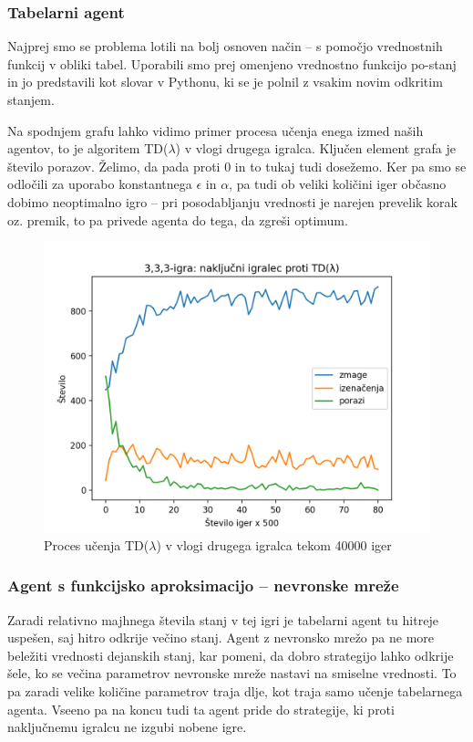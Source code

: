 \documentclass[12pt,a4paper]{amsart}
\theoremstyle{definition} %
\theoremstyle{plain} %
\begin{document}
\subsubsection{Tabelarni agent}
Najprej smo se problema lotili na bolj osnoven način -- s pomočjo vrednostnih funkcij v obliki tabel. 
Uporabili smo prej omenjeno vrednostno funkcijo po-stanj in jo predstavili kot slovar v Pythonu, ki 
se je polnil z vsakim novim odkritim stanjem.

Na spodnjem grafu lahko vidimo primer procesa učenja enega izmed naših agentov, to je algoritem 
TD($\lambda$) v vlogi drugega igralca. Ključen element grafa je število porazov. Želimo, da pada 
proti $0$ in to tukaj tudi dosežemo. Ker pa smo se odločili za uporabo konstantnega $\epsilon$ in 
$\alpha$, pa tudi ob veliki količini iger občasno dobimo neoptimalno igro -- pri posodabljanju 
vrednosti je narejen prevelik korak oz. premik, to pa privede agenta do tega, da zgreši optimum.

\begin{figure}[H]
    \includegraphics[scale=0.725]{../rezultati/tdl-333-40000-2.png}
    \caption{Proces učenja TD($\lambda$) v vlogi drugega igralca tekom 40000 iger}
\end{figure}

\subsubsection{Agent s funkcijsko aproksimacijo -- nevronske mreže}
Zaradi relativno majhnega števila stanj v tej igri je tabelarni agent tu hitreje uspešen, saj hitro 
odkrije večino stanj. Agent z nevronsko mrežo pa ne more beležiti vrednosti dejanskih stanj, kar pomeni, 
da dobro strategijo lahko odkrije šele, ko se večina parametrov nevronske mreže nastavi na smiselne 
vrednosti. To pa zaradi velike količine parametrov traja dlje, kot traja samo učenje tabelarnega agenta.
Vseeno pa na koncu tudi ta agent pride do strategije, ki proti naključnemu igralcu ne izgubi nobene igre.
\end{document}
